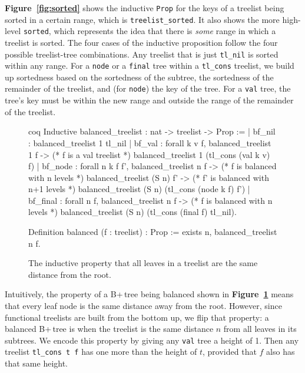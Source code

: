 \documentclass[12pt]{article}
\begin{document}
\textbf{Figure~\ref{fig:sorted}} shows the inductive \texttt{Prop} for the keys of a treelist being sorted in a certain range, which is \texttt{treelist\_sorted}. It also shows the more high-level \texttt{sorted}, which represents the idea that there is \textit{some} range in which a treelist is sorted. The four cases of the inductive proposition follow the four possible treelist-tree combinations. Any treelist that is just \texttt{tl\_nil} is sorted within any range. For a \texttt{node} or a \texttt{final} tree within a \texttt{tl\_cons} treelist, we build up sortedness based on the sortedness of the subtree, the sortedness of the remainder of the treelist, and (for \texttt{node}) the key of the tree. For a \texttt{val} tree, the tree's key must be within the new range and outside the range of the remainder of the treelist.

\begin{singlespace}
\begin{figure}[hpt]
\centering
\begin{cminted}{coq}
Inductive balanced_treelist : nat -> treelist -> Prop :=
| bf_nil : balanced_treelist 1 tl_nil
| bf_val : forall k v f,
    balanced_treelist 1 f -> (* f is a val treelist *)
    balanced_treelist 1 (tl_cons (val k v) f)
| bf_node : forall n k f f',
    balanced_treelist n f -> (* f is balanced with n levels *)
    balanced_treelist (S n) f' -> (* f' is balanced with n+1 levels *)
    balanced_treelist (S n) (tl_cons (node k f) f')
| bf_final : forall n f,
    balanced_treelist n f -> (* f is balanced with n levels *)
    balanced_treelist (S n) (tl_cons (final f) tl_nil).

Definition balanced (f : treelist) : Prop :=
  exists n, balanced_treelist n f.
\end{cminted}
\caption{The inductive property that all leaves in a treelist are the same distance from the root.}
\label{fig:balanced}
\end{figure}
\end{singlespace}

Intuitively, the property of a B+\,tree being balanced shown in \textbf{Figure~\ref{fig:balanced}} means that every leaf node is the same distance away from the root. However, since functional treelists are built from the bottom up, we flip that property: a balanced B+\,tree is when the treelist is the same distance $n$ from all leaves in its subtrees. We encode this property by giving any \texttt{val} tree a height of 1. Then any treelist \texttt{tl\_cons t f} has one more than the height of $t$, provided that $f$ also has that same height.
\end{document}
